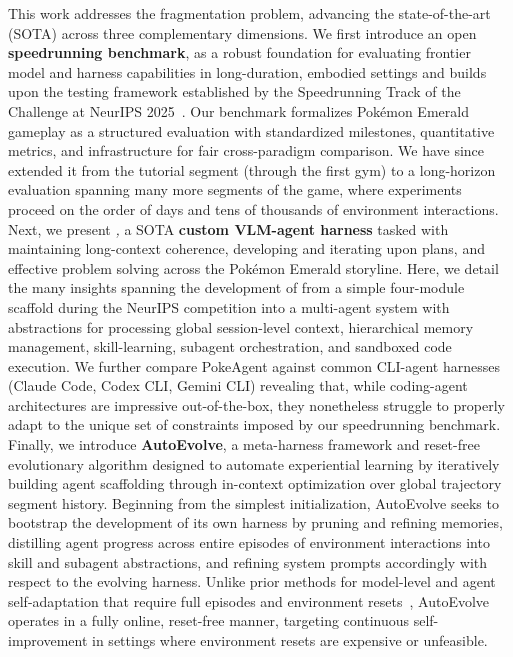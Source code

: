 This work addresses the fragmentation problem, advancing the state-of-the-art (SOTA) across three complementary dimensions. We first introduce an open \textbf{speedrunning benchmark}, as a robust foundation for evaluating frontier model and harness capabilities in long-duration, embodied settings and builds upon the testing framework established by the Speedrunning Track of the \pokeagent{} Challenge at NeurIPS 2025~\citep{karten2025pokeagent}. Our benchmark formalizes Pok\'{e}mon Emerald gameplay as a structured evaluation with standardized milestones, quantitative metrics, and infrastructure for fair cross-paradigm comparison. We have since extended it from the tutorial segment (through the first gym) to a long-horizon evaluation spanning many more segments of the game, where experiments proceed on the order of days and tens of thousands of environment interactions. Next, we present \textit{\pokeagent{},} a SOTA \textbf{custom VLM-agent harness} tasked with maintaining long-context coherence, developing and iterating upon plans, and effective problem solving across the Pok\'{e}mon Emerald storyline. Here, we detail the many insights spanning the development of \pokeagent{} from a simple four-module scaffold during the NeurIPS competition into a multi-agent system with abstractions for processing global session-level context, hierarchical memory management, skill-learning, subagent orchestration, and sandboxed code execution. We further compare PokeAgent against common CLI-agent harnesses (Claude Code, Codex CLI, Gemini CLI) revealing that, while coding-agent architectures are impressive out-of-the-box, they
nonetheless struggle to properly adapt to the unique set of constraints imposed by our speedrunning benchmark. Finally, we introduce \textbf{AutoEvolve}, a meta-harness framework and reset-free evolutionary algorithm designed to automate experiential learning by iteratively building agent scaffolding through in-context optimization over global trajectory segment history. Beginning from the simplest initialization, AutoEvolve seeks to bootstrap the development of its own harness by pruning and refining memories, distilling agent progress across entire episodes of environment interactions into skill and subagent abstractions, and refining system prompts accordingly with respect to the evolving harness. Unlike prior methods for model-level and agent self-adaptation that require full episodes and environment resets~\citep{agrawal2025gepa}, AutoEvolve operates in a fully online, reset-free manner, targeting continuous self-improvement in settings where environment resets are expensive or unfeasible. 


